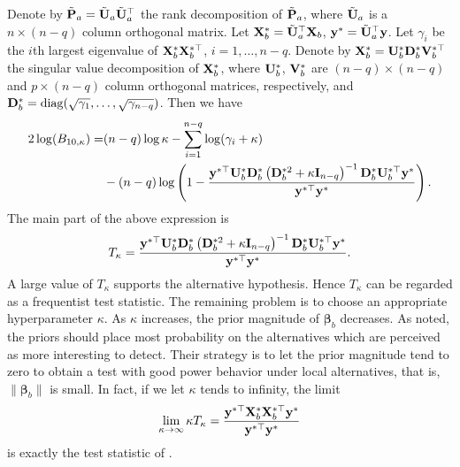 \documentclass[11pt]{article}
\DeclareMathOperator{\mydiag}{diag}
\newcommand{\By}{\mathbf{y}}    \newcommand{\Bz}{\mathbf{z}}
\newcommand{\bfsym}[1]{\ensuremath{\boldsymbol{#1}}}
\def\bbeta{\bfsym \beta}
\theoremstyle{plain}
\theoremstyle{definition}
\theoremstyle{remark}
\begin{document}
Denote by $\tilde {\mathbf{P}}_a=\tilde{\mathbf{U}}_a \tilde{\mathbf{U}}_a^\top$ the rank decomposition of $\tilde {\mathbf{P}}_a$, where $\tilde{\mathbf{U}}_a$ is a $n\times (n-q)$ column orthogonal matrix.
Let $\mathbf{X}_b^* = \tilde{\mathbf{U}}_a^\top \mathbf{X}_b$, $\By^* =\tilde \BU_a^\top \By$.
Let $\gamma_i$ be the $i$th largest eigenvalue of $\mathbf{X}^*_b \mathbf{X}_b^{*\top}$, $i=1,\ldots, n-q$.
Denote by $\mathbf{X}_b^* =\mathbf{U}_{b}^* \mathbf{D}_{b}^* \mathbf{V}_b^{*\top}$ the singular value decomposition of $\mathbf{X}_{b}^*$, where  $\mathbf{U}_{b}^*$, $\mathbf{V}_b^*$ are $(n-q)\times (n-q)$ and $p\times (n-q)$ column orthogonal matrices, respectively, and $\BD_{b}^*=\mydiag (\sqrt {\gamma_1},\ldots, \sqrt{\gamma_{n-q}})$.
Then we have
\begin{equation*}
    \begin{split}
        2\log (B_{10,\kappa})
        =&
        (n-q)\log \kappa - \sum_{i=1}^{n-q}\log ( \gamma_i + \kappa )
        \\
         &-(n-q)\log\left(1-\frac{\By^{*\top} \BU_b^*  \BD_b^{*} \left(  \BD_b^{*2} + \kappa \BI_{n-q} \right)^{-1} \BD_b^{*}   \BU_b^{*\top} \By^* }{\By^{*\top} \By^*}\right)
         .
    \end{split}
\end{equation*}
The main part of the above expression is
\begin{equation*}
    T_{\kappa} = \frac{\By^{*\top} \BU_b^*  \BD_b^{*} \left(  \BD_b^{*2} + \kappa \BI_{n-q} \right)^{-1} \BD_b^{*}   \BU_b^{*\top} \By^* }{\By^{*\top} \By^*}.
\end{equation*}
A large value of $T_{\kappa}$ supports the alternative hypothesis.
Hence $T_{\kappa}$ can be regarded as a frequentist test statistic.
The remaining problem is to choose an appropriate hyperparameter $\kappa$.
As $\kappa$ increases, the prior magnitude of $\bbeta_b$ decreases.
As \cite{Goeman2006} noted, the priors should place most probability on the alternatives which are perceived as more interesting to detect.
Their strategy is to let the prior magnitude tend to zero to obtain a test with good power behavior under local alternatives, that is, $\|\bbeta_b\|$ is small.
In fact, if we let $\kappa$ tends to infinity, the limit
\begin{equation*}
    \lim_{\kappa\to \infty} \kappa T_{\kappa} = \frac{\By^{*\top} \BX_b^* \BX_b^{*\top} \By^* }{\By^{*\top} \By^*}
\end{equation*}
is exactly the test statistic of \cite{Goeman2006}.
\end{document}
